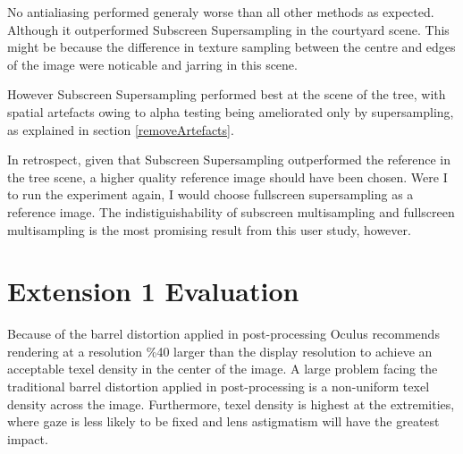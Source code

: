 \documentclass[12pt,a4paper,twoside,openright]{report}
\begin{document}
No antialiasing performed generaly worse than all other methods as expected. Although it outperformed Subscreen Supersampling in the courtyard scene. This might be because the difference in texture sampling between the centre and edges of the image were noticable and jarring in this scene.

However Subscreen Supersampling performed best at the scene of the tree, with spatial artefacts owing to alpha testing being ameliorated only by supersampling, as explained in section \ref{removeArtefacts}.

In retrospect, given that Subscreen Supersampling outperformed the reference in the tree scene, a higher quality reference image should have been chosen. Were I to run the experiment again, I would choose fullscreen supersampling as a reference image. The indistiguishability of subscreen multisampling and fullscreen multisampling is the most promising result from this user study, however.

\clearpage

\section{Extension 1 Evaluation}

Because of the barrel distortion applied in post-processing Oculus recommends rendering at a resolution \%40 larger than the display resolution to achieve an acceptable texel density in the center of the image.
A large problem facing the traditional barrel distortion applied in post-processing is a non-uniform texel density across the image. Furthermore, texel density is highest at the extremities, where gaze is less likely to be fixed and lens astigmatism will have the greatest impact. 
\end{document}
